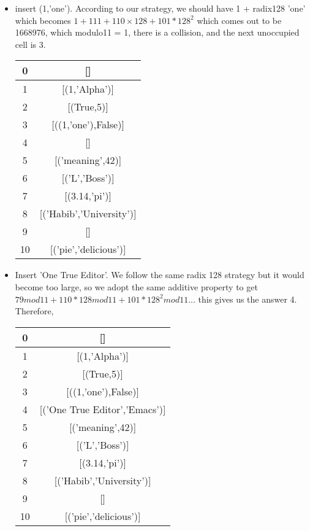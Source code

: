 \documentclass{article}
\begin{document}
\begin{enumerate}
\begin{itemize}
\begin{center}
\begin{tabular}{ |c|c| }
						\hline
					\end{tabular}
				\end{center}							
				\item insert (1,'one'). According to our strategy, we should have 1 + radix128 'one' which becomes $1 + 111 + 110 \times 128 + 101*128^2$ which comes out to be 1668976, which modulo11 = 1, there is a collision, and the next unoccupied cell is 3.
				\begin{center}
					\begin{tabular}{ |c|c| } 
						\hline
						0 & []   \\ 
						\hline
						1 &	[(1,'Alpha')] \\
						\hline 
						2 & [(True,5)]  \\ 
						\hline
						3&[((1,'one'),False)]\\
						\hline
						4&[]\\
						\hline
						5&[('meaning',42)]\\
						\hline
						6&[('L','Boss')]\\
						\hline
						7&[(3.14,'pi')]\\
						\hline
						8&[('Habib','University')]\\
						\hline
						9&[]\\
						\hline
						10&[('pie','delicious')]\\
						\hline
					\end{tabular}
				\end{center}
				\item Insert 'One True Editor'. We follow the same radix 128 strategy but it would become too large, so we adopt the same additive property to get $79 mod 11  + 110*128 mod 11 + 101*128^2 mod 11 ...$ this gives us the answer 4. Therefore,
				\begin{center}
					\begin{tabular}{ |c|c| } 
						\hline
						0 & []   \\ 
						\hline
						1 &	[(1,'Alpha')] \\
						\hline 
						2 & [(True,5)]  \\ 
						\hline
						3&[((1,'one'),False)]\\
						\hline
						4&[('One True Editor','Emacs')]\\
						\hline
						5&[('meaning',42)]\\
						\hline
						6&[('L','Boss')]\\
						\hline
						7&[(3.14,'pi')]\\
						\hline
						8&[('Habib','University')]\\
						\hline
						9&[]\\
						\hline
						10&[('pie','delicious')]\\
						\hline
					\end{tabular}
				\end{center}
		\end{itemize}
	\end{enumerate}
\end{document}
